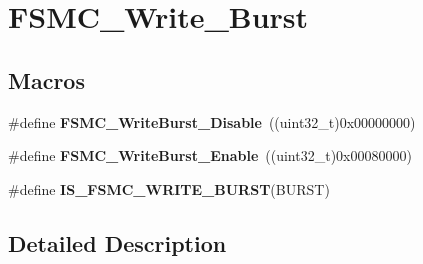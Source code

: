 \hypertarget{group___f_s_m_c___write___burst}{\section{F\-S\-M\-C\-\_\-\-Write\-\_\-\-Burst}
\label{group___f_s_m_c___write___burst}
}
\subsection*{Macros}
\begin{DoxyCompactItemize}
\item 
\hypertarget{group___f_s_m_c___write___burst_ga65a49ecd05b3a128e8908c6a625adae7}{\#define {\bfseries F\-S\-M\-C\-\_\-\-Write\-Burst\-\_\-\-Disable}~((uint32\-\_\-t)0x00000000)}\label{group___f_s_m_c___write___burst_ga65a49ecd05b3a128e8908c6a625adae7}

\item 
\hypertarget{group___f_s_m_c___write___burst_ga1b2b66a0eb42778c2cc9a05003cf7655}{\#define {\bfseries F\-S\-M\-C\-\_\-\-Write\-Burst\-\_\-\-Enable}~((uint32\-\_\-t)0x00080000)}\label{group___f_s_m_c___write___burst_ga1b2b66a0eb42778c2cc9a05003cf7655}

\item 
\#define {\bfseries I\-S\-\_\-\-F\-S\-M\-C\-\_\-\-W\-R\-I\-T\-E\-\_\-\-B\-U\-R\-S\-T}(B\-U\-R\-S\-T)
\end{DoxyCompactItemize}


\subsection{Detailed Description}



